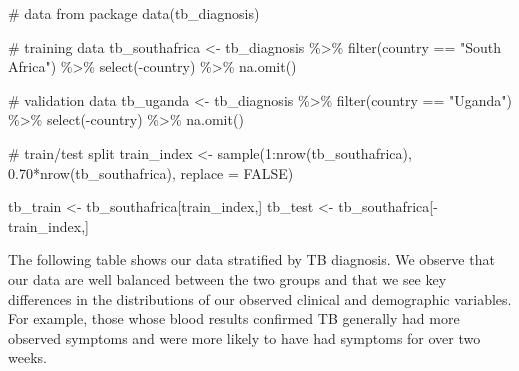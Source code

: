 \documentclass[
  letterpaper,
]{latex/krantz}
\makeatletter
\newenvironment{Shaded}{\begin{snugshade}}{\end{snugshade}}
\newcommand{\AttributeTok}[1]{\textcolor[rgb]{0.40,0.45,0.13}{#1}}
\newcommand{\CommentTok}[1]{\textcolor[rgb]{0.37,0.37,0.37}{#1}}
\newcommand{\ConstantTok}[1]{\textcolor[rgb]{0.56,0.35,0.01}{#1}}
\newcommand{\DecValTok}[1]{\textcolor[rgb]{0.68,0.00,0.00}{#1}}
\newcommand{\FloatTok}[1]{\textcolor[rgb]{0.68,0.00,0.00}{#1}}
\newcommand{\FunctionTok}[1]{\textcolor[rgb]{0.28,0.35,0.67}{#1}}
\newcommand{\NormalTok}[1]{\textcolor[rgb]{0.00,0.23,0.31}{#1}}
\newcommand{\OtherTok}[1]{\textcolor[rgb]{0.00,0.23,0.31}{#1}}
\newcommand{\SpecialCharTok}[1]{\textcolor[rgb]{0.37,0.37,0.37}{#1}}
\newcommand{\StringTok}[1]{\textcolor[rgb]{0.13,0.47,0.30}{#1}}
\newenvironment{kframe}{%
\medskip{}
\setlength{\fboxsep}{.8em}
 \def\at@end@of@kframe{}%
 \ifinner\ifhmode%
  \def\at@end@of@kframe{\end{minipage}}%
  \begin{minipage}{\columnwidth}%
 \fi\fi%
 \def\FrameCommand##1{\hskip\@totalleftmargin \hskip-\fboxsep
 \colorbox{shadecolor}{##1}\hskip-\fboxsep
     \hskip-\linewidth \hskip-\@totalleftmargin \hskip\columnwidth}%
 \MakeFramed {\advance\hsize-\width
   \@totalleftmargin\z@ \linewidth\hsize
   \@setminipage}}%
 {\par\unskip\endMakeFramed%
 \at@end@of@kframe}
\renewenvironment{Shaded}{\begin{kframe}}{\end{kframe}}
\makeatother
\begin{document}
\begin{Shaded}
\begin{Highlighting}[]
\CommentTok{\# data from package}
\FunctionTok{data}\NormalTok{(tb\_diagnosis)}

\CommentTok{\# training data}
\NormalTok{tb\_southafrica }\OtherTok{\textless{}{-}}\NormalTok{ tb\_diagnosis }\SpecialCharTok{\%\textgreater{}\%}
  \FunctionTok{filter}\NormalTok{(country }\SpecialCharTok{==} \StringTok{"South Africa"}\NormalTok{) }\SpecialCharTok{\%\textgreater{}\%}
  \FunctionTok{select}\NormalTok{(}\SpecialCharTok{{-}}\NormalTok{country) }\SpecialCharTok{\%\textgreater{}\%}
  \FunctionTok{na.omit}\NormalTok{()}

\CommentTok{\# validation data}
\NormalTok{tb\_uganda }\OtherTok{\textless{}{-}}\NormalTok{ tb\_diagnosis }\SpecialCharTok{\%\textgreater{}\%}
  \FunctionTok{filter}\NormalTok{(country }\SpecialCharTok{==} \StringTok{"Uganda"}\NormalTok{) }\SpecialCharTok{\%\textgreater{}\%}
  \FunctionTok{select}\NormalTok{(}\SpecialCharTok{{-}}\NormalTok{country) }\SpecialCharTok{\%\textgreater{}\%}
  \FunctionTok{na.omit}\NormalTok{()}

\CommentTok{\# train/test split}
\NormalTok{train\_index }\OtherTok{\textless{}{-}} \FunctionTok{sample}\NormalTok{(}\DecValTok{1}\SpecialCharTok{:}\FunctionTok{nrow}\NormalTok{(tb\_southafrica), }
                      \FloatTok{0.70}\SpecialCharTok{*}\FunctionTok{nrow}\NormalTok{(tb\_southafrica), }
                      \AttributeTok{replace =} \ConstantTok{FALSE}\NormalTok{)}

\NormalTok{tb\_train }\OtherTok{\textless{}{-}}\NormalTok{ tb\_southafrica[train\_index,]}
\NormalTok{tb\_test }\OtherTok{\textless{}{-}}\NormalTok{ tb\_southafrica[}\SpecialCharTok{{-}}\NormalTok{train\_index,]}
\end{Highlighting}
\end{Shaded}

The following table shows our data stratified by TB diagnosis. We
observe that our data are well balanced between the two groups and that
we see key differences in the distributions of our observed clinical and
demographic variables. For example, those whose blood results confirmed
TB generally had more observed symptoms and were more likely to have had
symptoms for over two weeks.
\end{document}
